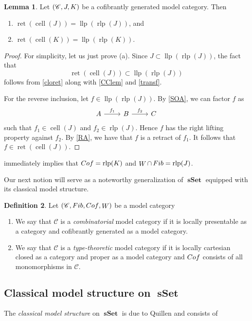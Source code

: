 \documentclass[10pt,letterpaper,cm]{nupset}
\theoremstyle{definition}
\newtheorem{definition}{Definition}[subsection]
\theoremstyle{theorem}
\newtheorem{lemma}[definition]{Lemma}
\theoremstyle{remark}
\newcommand{\0}{\mathbf{0}}
\newcommand{\1}{\mathbf{1}}
\newcommand{\2}{\mathbf{2}}
\DeclareMathOperator{\sset}{\mathbf{sSet}}
\renewcommand{\c}{\mathscr{C}}
\DeclareMathOperator{\fib}{\mathnormal{Fib}}
\DeclareMathOperator{\cof}{\mathnormal{Cof}}
\DeclareMathOperator{\we}{\mathnormal{W}}
\DeclareMathOperator{\cell}{cell}
\DeclareMathOperator{\ret}{ret}
\DeclareMathOperator{\rlp}{rlp}
\DeclareMathOperator{\llp}{llp}
\newcommand{\be}{\begin{enumerate}}
\newcommand{\ee}{\end{enumerate}}
\begin{document}
\begin{lemma}\label{cfsimp}
Let $\mleft(\c, J, K\mright)$ be a cofibrantly generated model category. Then 
\be[label=(\alph*)]
\item $\ret(\cell(J)) = \llp(\rlp(J))$, and
\item $\ret(\cell(K))= \llp(\rlp(K))$.
\ee
\end{lemma}
\begin{proof}
For simplicity, let us just prove (a). Since $J \subset \llp(\rlp(J))$, the fact that $$\ret(\cell(J)) \subset \llp(\rlp(J))$$ follows from  \cref{cloret} along with \cref{CClem} and \cref{transf}.

\smallskip

For the reverse inclusion, let $f\in \llp(\rlp(J))$. By \cref{SOA}, we can factor $f$ as
\[
\begin{tikzcd}
A \arrow[r, "f_1"] & B \arrow[r, "f_2"] & C
\end{tikzcd}
\] such that $f_1 \in \cell(J)$ and $f_2 \in \rlp(J)$. Hence $f$ has the right lifting property against $f_2$. By \cref{RA}, we have that $f$ is a retract of $f_1$. It follows that $f\in \ret(\cell(J))$.
\end{proof}

 immediately implies that $\cof = \rlp(K)$ and $\we \cap \fib = \rlp(J)$.

\medskip

Our next notion will serve as a noteworthy generalization of $\sset$ equipped with its classical model structure.

\begin{definition}
Let  $\mleft(\c, \fib, \cof, \we\mright)$ be a model category 
\be
\item We say that $\c$ is a \textit{combinatorial} model category if it is locally presentable as a category and cofibrantly generated as a model category.
\item We say that $\c$ is a \textit{type-theoretic} model category if it is  locally cartesian closed as a category and proper as a model category and $\cof$ consists of all monomorphisms in $\c$. 
\ee
\end{definition}


\subsection{Classical model structure on $\sset$}\label{cmodsset}

The \textit{classical model structure} on $\sset$ is due to Quillen and consists of
\end{document}
